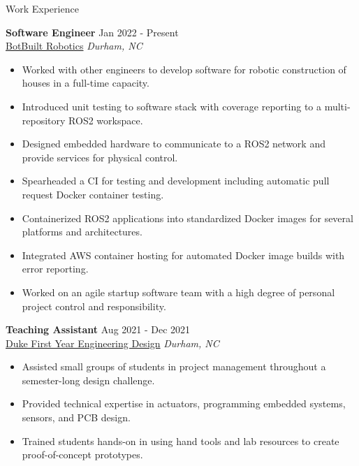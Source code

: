 \documentclass{resume}
\begin{document}
\begin{rSection}{Work Experience}

\textbf{Software Engineer} \hfill Jan 2022 - Present\\
\href{https://botbuilt.com}{BotBuilt Robotics} \hfill \textit{Durham, NC}
\begin{itemize}
    \itemsep -3pt {} 
    \item Worked with other engineers to develop software for robotic construction of houses in a full-time capacity.
    \item Introduced unit testing to software stack with coverage reporting to a multi-repository ROS2 workspace.
    \item Designed embedded hardware to communicate to a ROS2 network and provide services for physical control.
    \item Spearheaded a CI for testing and development including automatic pull request Docker container testing.
    \item Containerized ROS2 applications into standardized Docker images for several platforms and architectures.
    \item Integrated AWS container hosting for automated Docker image builds with error reporting.
    \item Worked on an agile startup software team with a high degree of personal project control and responsibility.
    \end{itemize}
 
\textbf{Teaching Assistant} \hfill Aug 2021 - Dec 2021\\
\href{https://fyd.duke.edu/}{Duke First Year Engineering Design} \hfill \textit{Durham, NC}
\begin{itemize}
    \itemsep -3pt {} 
    \item Assisted small groups of students in project management throughout a semester-long design challenge.
    \item Provided technical expertise in actuators, programming embedded systems, sensors, and PCB design.\
    \item Trained students hands-on in using hand tools and lab resources to create proof-of-concept prototypes.
\end{itemize}

\end{rSection} 

\end{document}

